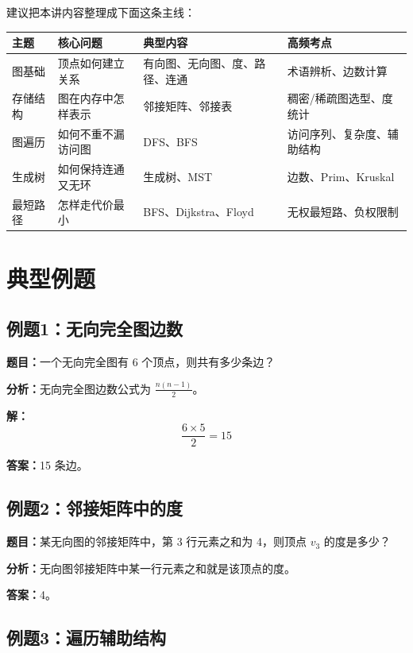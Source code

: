 \documentclass{../../note}
\begin{document}
建议把本讲内容整理成下面这条主线：

\begin{center}
\begin{tabular}{|>{\centering\arraybackslash}m{1.8cm}|>{\centering\arraybackslash}m{2.6cm}|>{\centering\arraybackslash}m{3.4cm}|>{\centering\arraybackslash}m{3.6cm}|}
\hline
主题 & 核心问题 & 典型内容 & 高频考点 \\
\hline
图基础 & 顶点如何建立关系 & 有向图、无向图、度、路径、连通 & 术语辨析、边数计算 \\
\hline
存储结构 & 图在内存中怎样表示 & 邻接矩阵、邻接表 & 稠密/稀疏图选型、度统计 \\
\hline
图遍历 & 如何不重不漏访问图 & DFS、BFS & 访问序列、复杂度、辅助结构 \\
\hline
生成树 & 如何保持连通又无环 & 生成树、MST & 边数、Prim、Kruskal \\
\hline
最短路径 & 怎样走代价最小 & BFS、Dijkstra、Floyd & 无权最短路、负权限制 \\
\hline
\end{tabular}
\end{center}

\section{典型例题}

\subsection{例题1：无向完全图边数}

\textbf{题目：}一个无向完全图有 6 个顶点，则共有多少条边？

\textbf{分析：}无向完全图边数公式为 $\frac{n(n-1)}{2}$。

\textbf{解：}
\[
\frac{6 \times 5}{2} = 15
\]

\textbf{答案：}15 条边。

\subsection{例题2：邻接矩阵中的度}

\textbf{题目：}某无向图的邻接矩阵中，第 3 行元素之和为 4，则顶点 $v_3$ 的度是多少？

\textbf{分析：}无向图邻接矩阵中某一行元素之和就是该顶点的度。

\textbf{答案：}4。

\subsection{例题3：遍历辅助结构}
\end{document}
